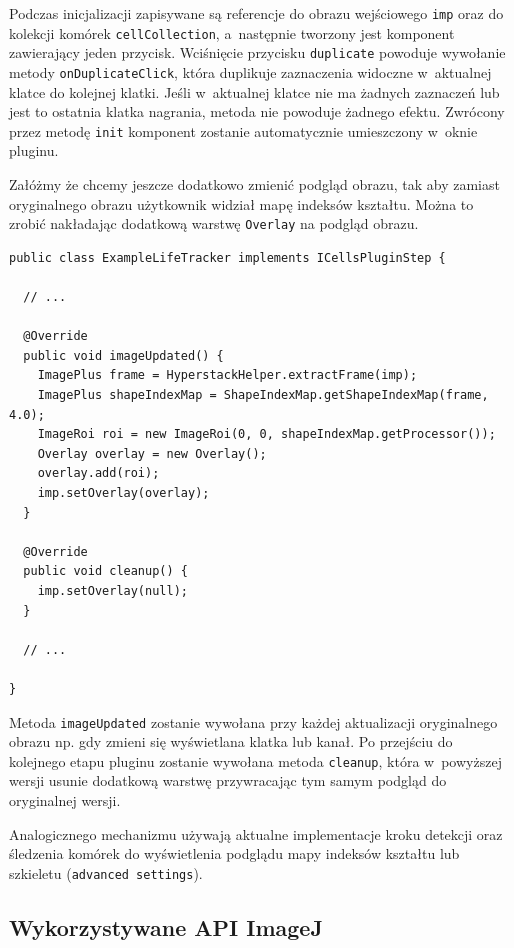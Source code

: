 \documentclass[declaration,shortabstract,mgr]{iithesis}
\begin{document}
Podczas inicjalizacji zapisywane są referencje do obrazu wejściowego \texttt{imp} oraz do kolekcji komórek \texttt{cellCollection}, a~następnie tworzony jest komponent zawierający jeden przycisk.
Wciśnięcie przycisku \texttt{duplicate} powoduje wywołanie metody \texttt{onDuplicateClick}, która duplikuje zaznaczenia widoczne w~aktualnej klatce do kolejnej klatki.
Jeśli w~aktualnej klatce nie ma żadnych zaznaczeń lub jest to ostatnia klatka nagrania, metoda nie powoduje żadnego efektu.
Zwrócony przez metodę \texttt{init} komponent zostanie automatycznie umieszczony w~oknie pluginu.

Załóżmy że chcemy jeszcze dodatkowo zmienić podgląd obrazu, tak aby zamiast oryginalnego obrazu użytkownik widział mapę indeksów kształtu.
Można to zrobić nakładając dodatkową warstwę \texttt{Overlay} na podgląd obrazu.

\par\bigskip

\begin{lstlisting}
public class ExampleLifeTracker implements ICellsPluginStep {

  // ...

  @Override
  public void imageUpdated() {
    ImagePlus frame = HyperstackHelper.extractFrame(imp);
    ImagePlus shapeIndexMap = ShapeIndexMap.getShapeIndexMap(frame, 4.0);
    ImageRoi roi = new ImageRoi(0, 0, shapeIndexMap.getProcessor());
    Overlay overlay = new Overlay();
    overlay.add(roi);
    imp.setOverlay(overlay);
  }

  @Override
  public void cleanup() {
    imp.setOverlay(null);
  }

  // ...

}
\end{lstlisting}

Metoda \texttt{imageUpdated} zostanie wywołana przy każdej aktualizacji oryginalnego obrazu np. gdy zmieni się wyświetlana klatka lub kanał.
Po przejściu do kolejnego etapu pluginu zostanie wywołana metoda \texttt{cleanup}, która w~powyższej wersji usunie dodatkową warstwę przywracając tym samym podgląd do oryginalnej wersji.

Analogicznego mechanizmu używają aktualne implementacje kroku detekcji oraz śledzenia komórek do wyświetlenia podglądu mapy indeksów kształtu lub szkieletu (\texttt{advanced settings}).

\subsection{Wykorzystywane API ImageJ}
\end{document}
